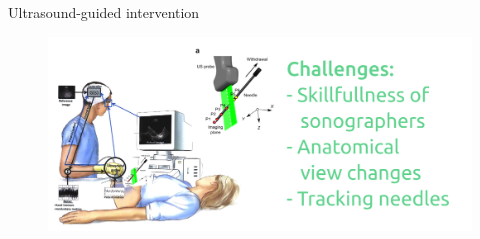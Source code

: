 {
    \begin{frame}{Ultrasound-guided intervention}
      \begin{figure}
        \centering
        \includegraphics[width=1.0\textwidth]{./../figures/sonographer-probe-patient/versions/drawing-v03.png}
      \end{figure}
\end{frame}
}
